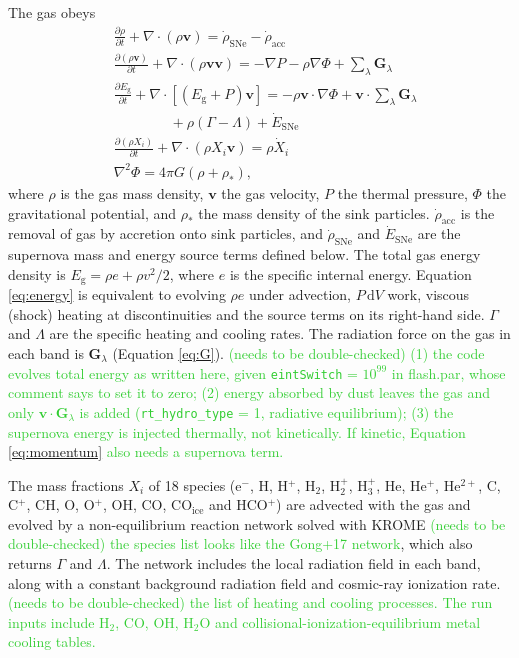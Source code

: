\documentclass[twocolumn,linenumbers]{aastex631}
\begin{document}
The gas obeys
\begin{align}
& \frac{\partial \rho}{\partial t} + \nabla \cdot (\rho \mathbf{v}) = \dot{\rho}_\mathrm{SNe} - \dot{\rho}_\mathrm{acc} \label{eq:mass}\\
& \frac{\partial (\rho \mathbf{v})}{\partial t} + \nabla \cdot (\rho \mathbf{vv}) = -\nabla P - \rho \nabla \Phi + \sum_\lambda \mathbf{G}_\lambda \label{eq:momentum}\\
& \frac{\partial E_\mathrm{g}}{\partial t} + \nabla \cdot \left[(E_\mathrm{g} + P)\mathbf{v}\right] = -\rho \mathbf{v} \cdot \nabla \Phi + \mathbf{v} \cdot \sum_\lambda \mathbf{G}_\lambda \nonumber\\
& \qquad\qquad + \rho(\Gamma - \Lambda) + \dot{E}_\mathrm{SNe} \label{eq:energy}\\
& \frac{\partial (\rho X_i)}{\partial t} + \nabla \cdot (\rho X_i \mathbf{v}) = \rho \dot{X}_i \label{eq:species}\\
& \nabla^2 \Phi = 4\pi G (\rho + \rho_*), \label{eq:poisson}
\end{align}
where $\rho$ is the gas mass density, $\mathbf{v}$ the gas velocity, $P$ the thermal pressure, $\Phi$ the gravitational potential, and $\rho_*$ the mass density of the sink particles. $\dot{\rho}_\mathrm{acc}$ is the removal of gas by accretion onto sink particles, and $\dot{\rho}_\mathrm{SNe}$ and $\dot{E}_\mathrm{SNe}$ are the supernova mass and energy source terms defined below. The total gas energy density is $E_\mathrm{g} = \rho e + \rho v^2/2$, where $e$ is the specific internal energy. Equation \ref{eq:energy} is equivalent to evolving $\rho e$ under advection, $P\,\mathrm{d}V$ work, viscous (shock) heating at discontinuities and the source terms on its right-hand side. $\Gamma$ and $\Lambda$ are the specific heating and cooling rates. The radiation force on the gas in each band is $\mathbf{G}_\lambda$ (Equation \ref{eq:G}). \textcolor{limegreen}{(needs to be double-checked) (1) the code evolves total energy as written here, given \texttt{eintSwitch} = $10^{99}$ in flash.par, whose comment says to set it to zero; (2) energy absorbed by dust leaves the gas and only $\mathbf{v}\cdot\mathbf{G}_\lambda$ is added (\texttt{rt\_hydro\_type} = 1, radiative equilibrium); (3) the supernova energy is injected thermally, not kinetically. If kinetic, Equation \ref{eq:momentum} also needs a supernova term.}

The mass fractions $X_i$ of 18 species (e$^-$, H, H$^+$, H$_2$, H$_2^+$, H$_3^+$, He, He$^+$, He$^{2+}$, C, C$^+$, CH, O, O$^+$, OH, CO, CO$_\mathrm{ice}$ and HCO$^+$) are advected with the gas and evolved by a non-equilibrium reaction network solved with KROME \citep{2014MNRAS.439.2386G} \textcolor{limegreen}{(needs to be double-checked) the species list looks like the Gong+17 network}, which also returns $\Gamma$ and $\Lambda$. The network includes the local radiation field in each band, along with a constant background radiation field and cosmic-ray ionization rate. \textcolor{limegreen}{(needs to be double-checked) the list of heating and cooling processes. The run inputs include H$_2$, CO, OH, H$_2$O and collisional-ionization-equilibrium metal cooling tables.}
\end{document}
